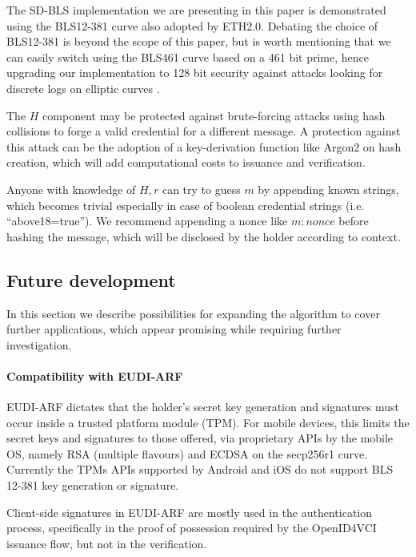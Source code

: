 The SD-BLS implementation we are presenting in this paper is
demonstrated using the BLS12-381 curve \cite{bls381-12} also adopted
by ETH2.0. Debating the choice of BLS12-381 is beyond the scope of
this paper, but is worth mentioning that we can easily switch using
the BLS461 curve based on a 461 bit prime, hence upgrading our
implementation to 128 bit security \cite{updating-key-pairings}
against attacks looking for discrete logs on elliptic curves
\cite{discrete-log-attack}.

The $H$ component may be protected against brute-forcing attacks using
hash collisions to forge a valid credential for a different message. A
protection against this attack can be the adoption of a key-derivation
function like Argon2 \cite{argon2} on hash creation, which will add
computational costs to issuance and verification.

Anyone with knowledge of $H,r$ can try to guess $m$ by appending known
strings, which becomes trivial especially in case of boolean
credential strings (i.e. ``above18=true''). We recommend appending a
nonce like $m:nonce$ before hashing the message, which will be
disclosed by the holder according to context.

\subsection{Future development}

In this section we describe possibilities for expanding the algorithm
to cover further applications, which appear promising while requiring
further investigation.

\paragraph{Compatibility with EUDI-ARF}

EUDI-ARF dictates that the holder's secret key generation and
signatures must occur inside a trusted platform module (TPM). For
mobile devices, this limits the secret keys and signatures to those
offered, via proprietary APIs by the mobile OS, namely RSA (multiple
flavours) and ECDSA on the secp256r1 curve. Currently the TPMs APIs
supported by Android and iOS do not support BLS 12-381 key generation
or signature.

Client-side signatures in EUDI-ARF are mostly used in the
authentication process, specifically in the proof of possession
required by the OpenID4VCI\cite{OID4VCI} issuance flow, but not in the
verification.

